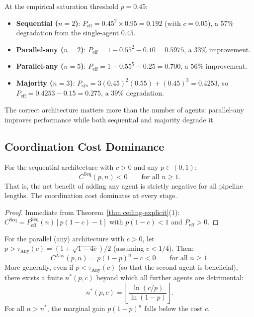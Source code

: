 \begin{example}[The Kim et al.\ Threshold: $p = 0.45$]
\label{ex:kim-threshold}
At the empirical saturation threshold $p = 0.45$:
\begin{itemize}
  \item \textbf{Sequential ($n = 2$)}: $P_{\mathrm{eff}} = 0.45^2 \times 0.95 = 0.192$
    (with $c = 0.05$), a $57\%$ degradation from the single-agent $0.45$.
  \item \textbf{Parallel-any ($n = 2$)}: $P_{\mathrm{eff}} = 1 - 0.55^2 - 0.10 =
    0.5975$, a $33\%$ improvement.
  \item \textbf{Parallel-any ($n = 5$)}: $P_{\mathrm{eff}} = 1 - 0.55^5 - 0.25 =
    0.700$, a $56\%$ improvement.
  \item \textbf{Majority ($n = 3$)}: $P_{\mathrm{sys}} = 3(0.45)^2(0.55) + (0.45)^3
    = 0.4253$, so $P_{\mathrm{eff}} = 0.4253 - 0.15 = 0.275$, a $39\%$ degradation.
\end{itemize}
The correct architecture matters more than the number of agents: parallel-any
improves performance while both sequential and majority degrade it.
\end{example}

\subsection{Coordination Cost Dominance}
\label{subsec:cost-dominance}

\begin{theorem}
\label{thm:cost-dominance-seq}
For the sequential architecture with $c > 0$ and any $p \in (0,1)$:
\[
  C^{\mathrm{Seq}}(p, n) < 0 \qquad \text{for all } n \geq 1.
\]
That is, the net benefit of adding any agent is strictly negative for all pipeline
lengths. The coordination cost dominates at every stage.
\end{theorem}

\begin{proof}
Immediate from Theorem~\ref{thm:ceiling-explicit}(1): $C^{\mathrm{Seq}} =
P_{\mathrm{eff}}^{\mathrm{Seq}}(n)[p(1-c)-1]$ with $p(1-c) < 1$ and
$P_{\mathrm{eff}} > 0$.
\end{proof}

\begin{theorem}
\label{thm:cost-dominance-any}
For the parallel (any) architecture with $c > 0$, let
$p > \tau_{\mathrm{Any}}(c) = (1 + \sqrt{1-4c})/2$ (assuming $c < 1/4$). Then:
\[
  C^{\mathrm{Any}}(p, n) = p(1-p)^n - c < 0 \qquad \text{for all } n \geq 1.
\]
More generally, even if $p < \tau_{\mathrm{Any}}(c)$ (so that the second agent is
beneficial), there exists a finite $n^*(p,c)$ beyond which all further agents are
detrimental:
\[
  n^*(p, c) = \left\lfloor \frac{\ln(c/p)}{\ln(1-p)} \right\rfloor.
\]
For all $n > n^*$, the marginal gain $p(1-p)^n$ falls below the cost $c$.
\end{theorem}

